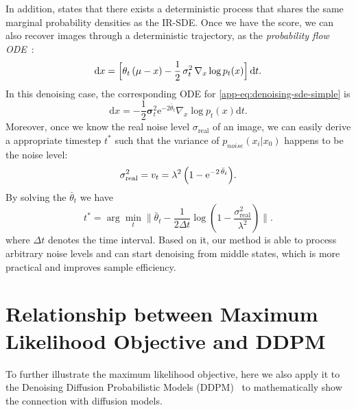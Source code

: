 \documentclass{article}
\newcommand{\diff}{\mathop{}\!\mathrm{d}}
\newcommand{\expp}{\mathrm{e}}
\theoremstyle{plain}
\theoremstyle{definition}
\theoremstyle{remark}
\begin{document}
In addition, \cite{song2021score} states that there exists a deterministic process that shares the same marginal probability densities as the IR-SDE. Once we have the score, we can also recover images through a deterministic trajectory, as the \textit{probability flow ODE}~\cite{song2021score}:
\begin{equation}
    \diff {x} = \Bigl[\theta_t \, (\mu - {x}) - \frac{1}{2} \, \sigma_t^2 \, \nabla_{{x}}\log p_t({x}) \Bigr]\diff t.
    \label{app-eq:reverse-irode}
\end{equation}
In this denoising case, the corresponding ODE for \eqref{app-eq:denoising-sde-simple} is
\begin{equation}
    {\mathrm d}{x} = -\frac{1}{2}\bm{\sigma}_t^2 \mathrm{e}^{-2\bar{{\theta}}_t} \nabla_{{x}}\log p_t({x}){\mathrm d}t.
    \label{app-eq:denoising-ode-simple}
\end{equation}
Moreover, once we know the real noise level $\sigma_{\mathrm{real}}$ of an image, we can easily derive a appropriate timestep $t^*$ such that the variance of $p_{noise}({x}_i|{x}_0)$ happens to be the noise level:
\begin{equation}
    \sigma_{\mathrm{real}}^2 = v_t = \lambda^2 \, \Bigl(1 - \expp^{-2 \, \bar{\theta}_{t}}\Bigr).
\end{equation}
By solving the $\bar{{\theta}}_t$ we have
\begin{equation}
    t^* = \arg\min_{t} \| \bar{{\theta}}_t - \frac{1}{2\Delta t} \log (1 - \frac{\sigma_{\mathrm{real}}^2}{\lambda^2}) \|. 
\end{equation}
where $\Delta t$ denotes the time interval. Based on it, our method is able to process arbitrary noise levels and can start denoising from middle states, which is more practical and improves sample efficiency.

\section{Relationship between Maximum Likelihood Objective and DDPM}
\label{app-sec:mlo_ddpm}

To further illustrate the maximum likelihood objective, here we also apply it to the Denoising Diffusion Probabilistic Models (DDPM)~\cite{ho2020denoising} to mathematically show the connection with diffusion models.
\end{document}
